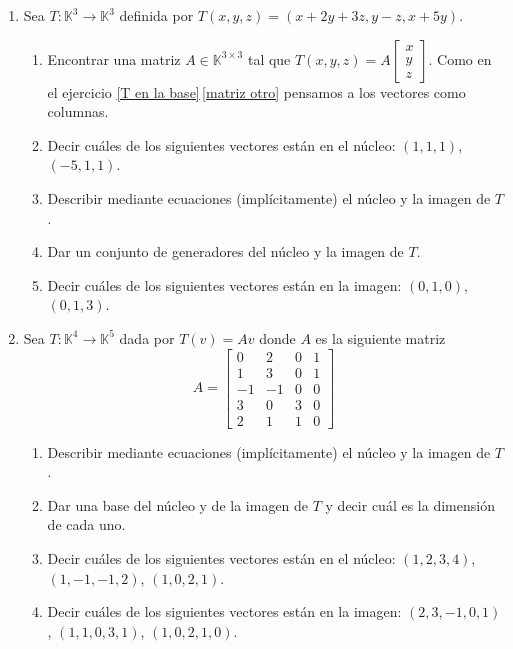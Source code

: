\begin{enumerate}[topsep=6pt, itemsep=.4cm]
    \item\label{Txyz} Sea $T:\mathbb{K}^3\longrightarrow\mathbb{K}^3$ definida por $T(x,y,z)=(x+2y+3z, y-z,x+5y)$.
        \begin{enumerate}
        \item\label{matriz de T} Encontrar una matriz  $A\in\mathbb{K}^{3\times 3}$ tal que $T(x,y,z)=A\begin{bmatrix}
                x\\y\\z \end{bmatrix}
                $.  Como en el ejercicio  \ref{T en la base}\,\ref{matriz otro} pensamos a los vectores como columnas.
        \item\label{Txyz-vectores-nucleo} Decir cuáles de los siguientes vectores están en el núcleo: $(1,1,1)$, $(-5,1,1)$.
        \item\label{Txyz nucleo imagen de T implicito} Describir mediante ecuaciones (implícitamente) el núcleo y la imagen de $T$.
        \item\label{Txyz  nucleo imagen T generadores} Dar un conjunto de generadores del núcleo y la imagen de $T$.
        \item\label{Txyz imagen} Decir cuáles de los siguientes vectores están en la imagen: $(0,1,0)$, $(0,1,3)$.
        \end{enumerate}


\item Sea $T: \mathbb{K}^4 \to \mathbb{K}^5$ dada por $T(v) = Av$ donde $A$ es la siguiente matriz
    $$
    A=\begin{bmatrix}
    0& 2& 0&1\\   1& 3& 0&1\\  -1&-1&0&0\\3&0&3&0\\2&1&1&0 \end{bmatrix}
    $$
    \begin{enumerate}[topsep=5pt,itemsep=5pt]
        \item Describir mediante ecuaciones (implícitamente) el núcleo y la imagen de $T$.
        \item Dar una base del núcleo y de la imagen de $T$ y decir cuál es la dimensión de cada uno. 
        \item Decir cuáles de los siguientes vectores están en el núcleo:
        $(1,2,3,4)$, $(1,-1,-1,2)$, $(1,0,2,1)$.
        \item Decir cuáles de los siguientes vectores están en la imagen:
        $(2,3,-1,0,1)$, $(1,1,0,3,1)$, $(1,0,2,1,0)$.
    \end{enumerate} 
    


\end{enumerate}
